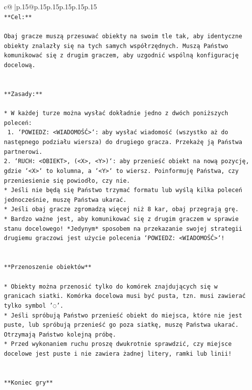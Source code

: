 \documentclass{article}
\begin{document}
{\begin{supertabular}{c@{$\;$}|p{.15\linewidth}@{}p{.15\linewidth}p{.15\linewidth}p{.15\linewidth}p{.15\linewidth}p{.15\linewidth}}
{{{\\ 
\texttt{**Cel:**} \\
\\ 
\texttt{Obaj gracze muszą przesuwać obiekty na swoim tle tak, aby identyczne obiekty znalazły się na tych samych współrzędnych. Muszą Państwo komunikować się z drugim graczem, aby uzgodnić wspólną konfigurację docelową.} \\
\\ 
\\ 
\texttt{**Zasady:**} \\
\\ 
\texttt{* W każdej turze można wysłać dokładnie jedno z dwóch poniższych poleceń:} \\
\texttt{ 1. `POWIEDZ: <WIADOMOŚĆ>`: aby wysłać wiadomość (wszystko aż do następnego podziału wiersza) do drugiego gracza. Przekażę ją Państwa partnerowi.} \\
\texttt{2. `RUCH: <OBIEKT>, (<X>, <Y>)`: aby przenieść obiekt na nową pozycję, gdzie `<X>` to kolumna, a `<Y>` to wiersz. Poinformuję Państwa, czy przeniesienie się powiodło, czy nie.} \\
\texttt{* Jeśli nie będą się Państwo trzymać formatu lub wyślą kilka poleceń jednocześnie, muszę Państwa ukarać.} \\
\texttt{* Jeśli obaj gracze zgromadzą więcej niż 8 kar, obaj przegrają grę.} \\
\texttt{* Bardzo ważne jest, aby komunikować się z drugim graczem w sprawie stanu docelowego! *Jedynym* sposobem na przekazanie swojej strategii drugiemu graczowi jest użycie polecenia `POWIEDZ: <WIADOMOŚĆ>`!} \\
\\ 
\\ 
\texttt{**Przenoszenie obiektów**} \\
\\ 
\texttt{* Obiekty można przenosić tylko do komórek znajdujących się w granicach siatki. Komórka docelowa musi być pusta, tzn. musi zawierać tylko symbol '◌'.} \\
\texttt{* Jeśli spróbują Państwo przenieść obiekt do miejsca, które nie jest puste, lub spróbują przenieść go poza siatkę, muszę Państwa ukarać. Otrzymają Państwo kolejną próbę.} \\
\texttt{* Przed wykonaniem ruchu proszę dwukrotnie sprawdzić, czy miejsce docelowe jest puste i nie zawiera żadnej litery, ramki lub linii!} \\
\\ 
\\ 
\texttt{**Koniec gry**} \\
}}}
\end{supertabular}}
\end{document}
